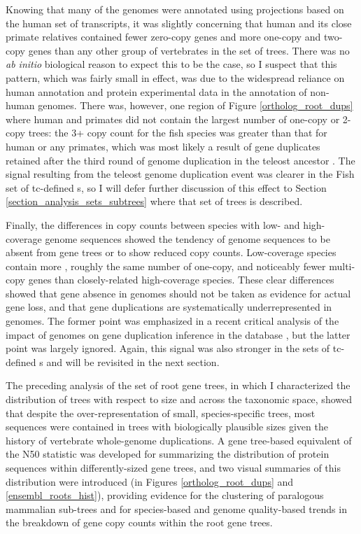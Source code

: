 Knowing that many of the \lcv genomes were annotated using projections
based on the human set of transcripts, it was slightly concerning that
human and its close primate relatives contained fewer zero-copy genes
and more one-copy and two-copy genes than any other group of
vertebrates in the \cmp set of trees. There was no \emph{ab initio}
biological reason to expect this to be the case, so I suspect that
this pattern, which was fairly small in effect, was due to the
widespread reliance on human annotation and protein experimental data
in the annotation of non-human genomes. There was, however, one region
of Figure \ref{ortholog_root_dups} where human and primates did not
contain the largest number of one-copy or 2-copy trees: the 3+ copy
count for the fish species was greater than that for human or any
primates, which was most likely a result of gene duplicates retained
after the third round of genome duplication in the teleost ancestor
\citep{Jaillon2004}. The signal resulting from the teleost genome
duplication event was clearer in the Fish set of \ac{tc}-defined
\subtr{}s, so I will defer further discussion of this effect to
Section \ref{section_analysis_sets_subtrees} where that set of trees
is described.

Finally, the differences in copy counts between species with low- and
high-coverage genome sequences showed the tendency of \lcv genome
sequences to be absent from gene trees or to show reduced copy
counts. Low-coverage species contain more \zcop, roughly the same
number of one-copy, and noticeably fewer multi-copy genes than
closely-related high-coverage species. These clear differences showed
that gene absence in \lcv genomes should not be taken as evidence for
actual gene loss, and that gene duplications are systematically
underrepresented in \lcv genomes. The former point was emphasized in a
recent critical analysis of the impact of \lcv genomes on gene
duplication inference in the \cmp database \citep{Milinkovitch2010},
but the latter point was largely ignored. Again, this signal was also
stronger in the sets of \ac{tc}-defined \mammln \subtr{}s and will be
revisited in the next section.

The preceding analysis of the set of root \cmp gene trees, in which I
characterized the distribution of trees with respect to size and
across the taxonomic space, showed that despite the
over-representation of small, species-specific trees, most sequences
were contained in trees with biologically plausible sizes given the
history of vertebrate whole-genome duplications. A gene tree-based
equivalent of the N50 statistic was developed for summarizing the
distribution of protein sequences within differently-sized gene trees,
and two visual summaries of this distribution were introduced (in
Figures \ref{ortholog_root_dups} and \ref{ensembl_roots_hist}),
providing evidence for the clustering of paralogous mammalian
sub-trees and for species-based and genome quality-based trends in the
breakdown of gene copy counts within the root \cmp gene trees.

